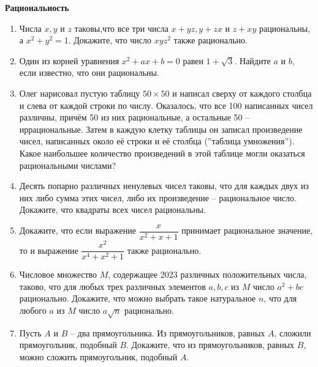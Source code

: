 \documentclass{article}
\begin{document}
\large
	

\begin{center}
\textbf{Рациональность}
\end{center}

\begin{enumerate}[label*=\protect\fbox{\arabic{enumi}}]

\item Числа $x, y$ и $z$ таковы,что все три числа $x+ y z, y+ z x$ и $z+ x y$ рациональны, а $x^2 +  y^2 = 1$. Докажите, что число  $x y z^2$ также рационально.

\item Один из корней уравнения  $x^2 +  a x +  b = 0$ равен $1 + \sqrt{3}$. Найдите $a$ и $b$, если известно, что они рациональны.


\item Олег нарисовал пустую таблицу $50 \times 50$ и написал сверху от каждого столбца и слева от каждой строки по числу. Оказалось, что все 100 написанных чисел различны, причём 50 из них рациональные, а остальные 50 – иррациональные. Затем в каждую клетку таблицы он записал произведение чисел, написанных около её строки и её столбца (”таблица умножения”). Какое наибольшее количество произведений в этой таблице могли оказаться рациональными числами?

\item Десять попарно различных ненулевых чисел таковы, что для каждых двух из них либо сумма этих чисел, либо их произведение – рациональное число. Докажите, что квадраты всех чисел рациональны.

\item Докажите, что если выражение  $\dfrac{x}{x^2 + x + 1}$ принимает рациональное значение, то и выражение  $\dfrac{x^2}{x^4 + x^2 + 1}$  также рационально.

\item Числовое множество $M$, содержащее 2023 различных положительных числа, таково, что для любых трех различных элементов  $a,  b, c$ из $M$ число  $a^2 +  bc$ рационально. Докажите, что можно выбрать такое натуральное $n$, что для любого $a$ из $M$ число  $a\sqrt{n}$ рационально.

\item Пусть $A$ и $B$ – два прямоугольника. Из прямоугольников, равных $A$, сложили прямоугольник, подобный $B$. Докажите, что из прямоугольников, равных $B$, можно сложить прямоугольник, подобный $A$.

\end{enumerate}
\end{document}
